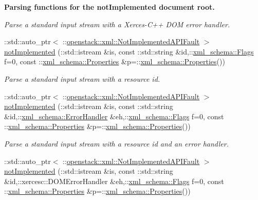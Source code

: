 \begin{Indent}{\bf Parsing functions for the notImplemented document root.}
\begin{DoxyCompactItemize}
\begin{DoxyCompactList}\small\item\em Parse a standard input stream with a Xerces-\/C++ DOM error handler. \item\end{DoxyCompactList}\item 
::std::auto\_\-ptr$<$ ::\hyperlink{classopenstack_1_1xml_1_1NotImplementedAPIFault}{openstack::xml::NotImplementedAPIFault} $>$ \hyperlink{namespaceopenstack_1_1xml_abbb9b265c6b14f3fad471a3321817dd7}{notImplemented} (::std::istream \&is, const ::std::string \&id,::\hyperlink{namespacexml__schema_affb4c227cbd9aa7453dd1dc5a1401943}{xml\_\-schema::Flags} f=0, const ::\hyperlink{namespacexml__schema_ad27ce19a7ee1d3b1064092648898f64c}{xml\_\-schema::Properties} \&p=::\hyperlink{namespacexml__schema_ad27ce19a7ee1d3b1064092648898f64c}{xml\_\-schema::Properties}())
\begin{DoxyCompactList}\small\item\em Parse a standard input stream with a resource id. \item\end{DoxyCompactList}\item 
::std::auto\_\-ptr$<$ ::\hyperlink{classopenstack_1_1xml_1_1NotImplementedAPIFault}{openstack::xml::NotImplementedAPIFault} $>$ \hyperlink{namespaceopenstack_1_1xml_a17ed99924186ece7ded7f457f07348ce}{notImplemented} (::std::istream \&is, const ::std::string \&id,::\hyperlink{namespacexml__schema_ab1c9361bfd3b404eaabf0c31eded79dc}{xml\_\-schema::ErrorHandler} \&eh,::\hyperlink{namespacexml__schema_affb4c227cbd9aa7453dd1dc5a1401943}{xml\_\-schema::Flags} f=0, const ::\hyperlink{namespacexml__schema_ad27ce19a7ee1d3b1064092648898f64c}{xml\_\-schema::Properties} \&p=::\hyperlink{namespacexml__schema_ad27ce19a7ee1d3b1064092648898f64c}{xml\_\-schema::Properties}())
\begin{DoxyCompactList}\small\item\em Parse a standard input stream with a resource id and an error handler. \item\end{DoxyCompactList}\item 
::std::auto\_\-ptr$<$ ::\hyperlink{classopenstack_1_1xml_1_1NotImplementedAPIFault}{openstack::xml::NotImplementedAPIFault} $>$ \hyperlink{namespaceopenstack_1_1xml_a98fc851529cf910a431d22382194a308}{notImplemented} (::std::istream \&is, const ::std::string \&id,::xercesc::DOMErrorHandler \&eh,::\hyperlink{namespacexml__schema_affb4c227cbd9aa7453dd1dc5a1401943}{xml\_\-schema::Flags} f=0, const ::\hyperlink{namespacexml__schema_ad27ce19a7ee1d3b1064092648898f64c}{xml\_\-schema::Properties} \&p=::\hyperlink{namespacexml__schema_ad27ce19a7ee1d3b1064092648898f64c}{xml\_\-schema::Properties}())

\end{DoxyCompactItemize}
\end{Indent}
